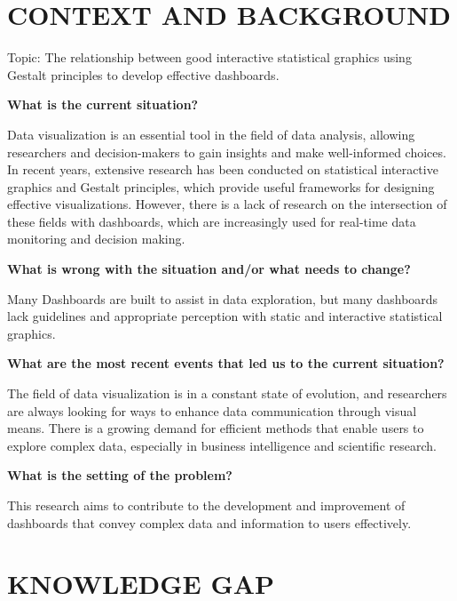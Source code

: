 \documentclass[print]{nuthesis}
\begin{document}

\hypertarget{context-and-background}{%
\chapter{CONTEXT AND BACKGROUND}\label{context-and-background}}

Topic: The relationship between good interactive statistical graphics using Gestalt principles to develop effective dashboards.

\textbf{What is the current situation?}

Data visualization is an essential tool in the field of data analysis, allowing researchers and decision-makers to gain insights and make well-informed choices.
In recent years, extensive research has been conducted on statistical interactive graphics and Gestalt principles, which provide useful frameworks for designing effective visualizations.
However, there is a lack of research on the intersection of these fields with dashboards, which are increasingly used for real-time data monitoring and decision making.

\textbf{What is wrong with the situation and/or what needs to change?}

Many Dashboards are built to assist in data exploration, but many dashboards lack guidelines and appropriate perception with static and interactive statistical graphics.

\textbf{What are the most recent events that led us to the current situation?}

The field of data visualization is in a constant state of evolution, and researchers are always looking for ways to enhance data communication through visual means.
There is a growing demand for efficient methods that enable users to explore complex data, especially in business intelligence and scientific research.

\textbf{What is the setting of the problem?}

This research aims to contribute to the development and improvement of dashboards that convey complex data and information to users effectively.

\hypertarget{knowledge-gap}{%
\chapter{KNOWLEDGE GAP}\label{knowledge-gap}}
\end{document}
